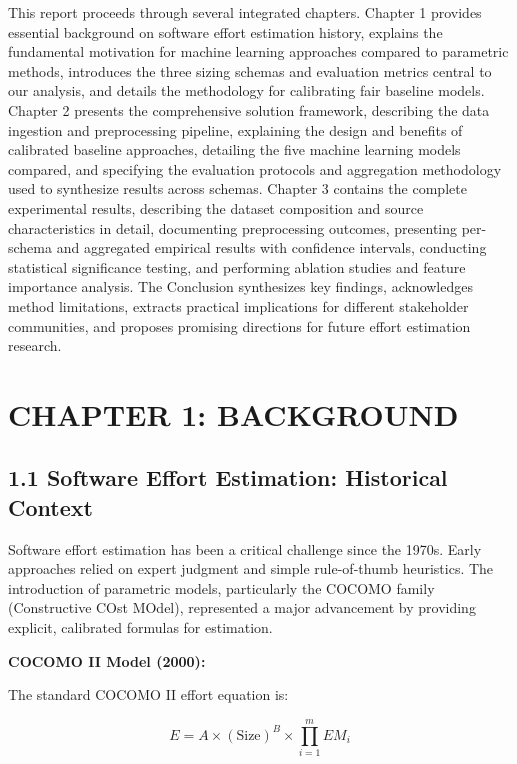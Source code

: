 \documentclass[11pt,a4paper]{article}
\begin{document}
This report proceeds through several integrated chapters. Chapter 1 provides essential background on software effort estimation history, explains the fundamental motivation for machine learning approaches compared to parametric methods, introduces the three sizing schemas and evaluation metrics central to our analysis, and details the methodology for calibrating fair baseline models. Chapter 2 presents the comprehensive solution framework, describing the data ingestion and preprocessing pipeline, explaining the design and benefits of calibrated baseline approaches, detailing the five machine learning models compared, and specifying the evaluation protocols and aggregation methodology used to synthesize results across schemas. Chapter 3 contains the complete experimental results, describing the dataset composition and source characteristics in detail, documenting preprocessing outcomes, presenting per-schema and aggregated empirical results with confidence intervals, conducting statistical significance testing, and performing ablation studies and feature importance analysis. The Conclusion synthesizes key findings, acknowledges method limitations, extracts practical implications for different stakeholder communities, and proposes promising directions for future effort estimation research.

\newpage

\section{CHAPTER 1: BACKGROUND}

\subsection{1.1 Software Effort Estimation: Historical Context}

Software effort estimation has been a critical challenge since the 1970s. Early approaches relied on expert judgment and simple rule-of-thumb heuristics. The introduction of parametric models, particularly the COCOMO family (Constructive COst MOdel), represented a major advancement by providing explicit, calibrated formulas for estimation.

\textbf{COCOMO II Model (2000):}

The standard COCOMO II effort equation is:

\begin{equation}
E = A \times (\text{Size})^{B} \times \prod_{i=1}^{m} EM_i
\label{eq:cocomo}
\end{equation}
\end{document}
